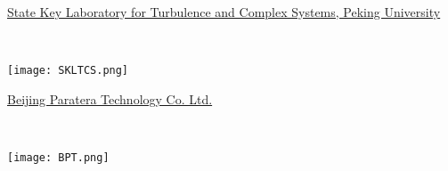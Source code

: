 \vspace{1em}

\begin{minipage}[c]{0.42\linewidth}
\href{http://ltcs.pku.edu.cn}{State Key Laboratory for Turbulence and Complex Systems, Peking University}
\end{minipage}
\begin{minipage}[c]{0.05\linewidth}
~
\end{minipage}
\begin{minipage}[c]{0.5\linewidth}
\texttt{[image: SKLTCS.png]}
\end{minipage}

\vspace{1em}

\begin{minipage}[c]{0.42\linewidth}
\href{http://en.paratera.com}{Beijing Paratera Technology Co. Ltd. }
\end{minipage}
\begin{minipage}[c]{0.05\linewidth}
~
\end{minipage}
\begin{minipage}[c]{0.5\linewidth}
\texttt{[image: BPT.png]}
\end{minipage}